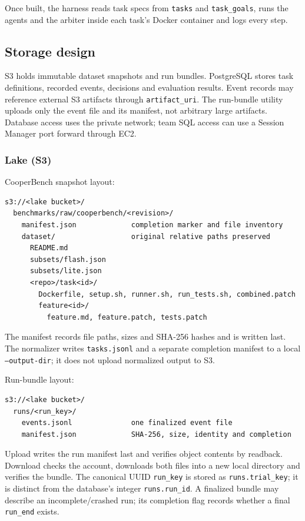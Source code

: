 \documentclass[11pt]{article}
\newcommand{\code}[1]{\texttt{#1}}
\begin{document}
Once built, the harness reads task specs from \code{tasks} and \code{task\_goals}, runs the agents and the arbiter inside each task's Docker container and logs every step.

\subsection*{Storage design}

S3 holds immutable dataset snapshots and run bundles. PostgreSQL stores task definitions, recorded events, decisions and evaluation results. Event records may reference external S3 artifacts through \code{artifact\_uri}. The run-bundle utility uploads only the event file and its manifest, not arbitrary large artifacts. Database access uses the private network; team SQL access can use a Session Manager port forward through EC2.

\subsubsection*{Lake (S3)}

CooperBench snapshot layout:

{\small
\begin{verbatim}
s3://<lake bucket>/
  benchmarks/raw/cooperbench/<revision>/
    manifest.json             completion marker and file inventory
    dataset/                  original relative paths preserved
      README.md
      subsets/flash.json
      subsets/lite.json
      <repo>/task<id>/
        Dockerfile, setup.sh, runner.sh, run_tests.sh, combined.patch
        feature<id>/
          feature.md, feature.patch, tests.patch
\end{verbatim}
}

The manifest records file paths, sizes and SHA-256 hashes and is written last. The normalizer writes \code{tasks.jsonl} and a separate completion manifest to a local \code{--output-dir}; it does not upload normalized output to S3.

Run-bundle layout:

{\small
\begin{verbatim}
s3://<lake bucket>/
  runs/<run_key>/
    events.jsonl              one finalized event file
    manifest.json             SHA-256, size, identity and completion
\end{verbatim}
}

Upload writes the run manifest last and verifies object contents by readback. Download checks the account, downloads both files into a new local directory and verifies the bundle. The canonical UUID \code{run\_key} is stored as \code{runs.trial\_key}; it is distinct from the database's integer \code{runs.run\_id}. A finalized bundle may describe an incomplete/crashed run; its completion flag records whether a final \code{run\_end} exists.
\end{document}
